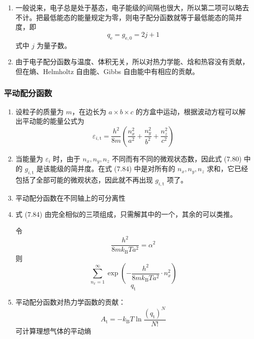 \begin{enumerate}
    \item 
    一般说来，电子总是处于基态，电子能级的间隔也很大，所以第二项可以略去不计。把最低能态的能量规定为零，则电子配分函数就等于最低能态的简并度，即
    \begin{equation*}
        q_{\mathrm{e}} = g_{\mathrm{e},0} = 2j + 1
    \end{equation*}
    式中 $j$ 为量子数。
    \item 由于电子配分函数与温度、体积无关，所以对热力学能、焓和热容没有贡献，但在熵、Helmholtz 自由能、Gibbs 自由能中有相应的贡献。
\end{enumerate}

\subsubsection{平动配分函数}

\begin{enumerate}
    \item 设粒子的质量为 $m$，在边长为 $a \times b \times c$ 的方盒中运动，根据波动方程可以解出平动能的能量公式为
    \begin{equation}
        \varepsilon_{i,\mathrm{t}} = \frac{h^2}{8m} \left(\frac{n_x^2}{a^2} + \frac{n_y^2}{b^2} + \frac{n_z^2}{c^2}\right)
    \end{equation}
    \item 当能量为 $\varepsilon_i$ 时，由于 $n_x, n_y, n_z$ 不同而有不同的微观状态数，因此式 (7.80) 中的 $g_{i,\mathrm{t}}$ 是该能级的简并度。在式 (7.84) 中是对所有的 $n_x, n_y, n_z$ 求和，它已经包括了全部可能的微观状态，因此就不再出现 $g_{i,\mathrm{t}}$ 项了。
    \item 平动配分函数在不同轴上的可分离性
    \item 式 (7.84) 由完全相似的三项组成，只需解其中的一个，其余的可以类推。
    
    令
    \begin{equation*}
        \frac{h^2}{8m k_\mathrm{B} T a^2} = \alpha^2
    \end{equation*}
    则
    \begin{equation*}
        \sum_{n_x = 1}^{\infty} \exp\left(-\frac{h^2}{8m k_\mathrm{B} T a^2} \cdot n_x^2\right)
    \end{equation*}
    \begin{equation}
        q_{\mathrm{t}}
    \end{equation}
    \item 平动配分函数对热力学函数的贡献：
    \begin{equation}
        A_{\mathrm{t}} = -k_\mathrm{B} T \ln{\frac{\left(q_{\mathrm{t}}\right)^N}{N!}}
    \end{equation}
    可计算理想气体的平动熵
\end{enumerate}

